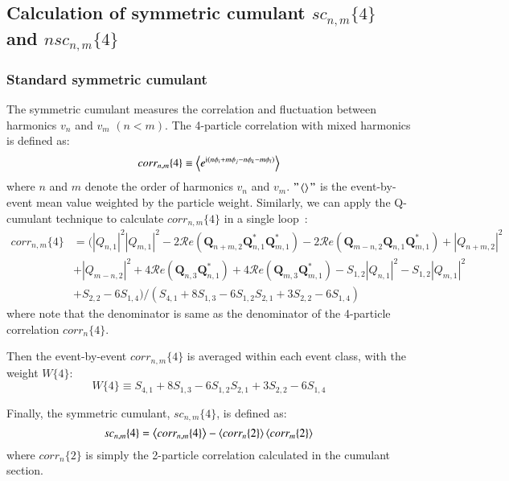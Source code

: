 \subsection{Calculation of symmetric cumulant $sc_{n,m}\{4\}$ and $nsc_{n,m}\{4\}$}
\subsubsection{Standard symmetric cumulant}
The symmetric cumulant measures the correlation and fluctuation between harmonics $v_n$ and $v_m$ $(n<m)$. The 4-particle correlation with mixed harmonics is defined as:
\begin{equation}
corr_{n,m}\{4\}\equiv\left\langle e^{\text{i}(n\phi_i+m\phi_j-n\phi_k-m\phi_l)}\right\rangle
\end{equation}
where $n$ and $m$ denote the order of harmonics $v_n$ and $v_m$. $"\left\langle \right\rangle"$ is the event-by-event mean value weighted by the particle weight. Similarly, we can apply the Q-cumulant technique to calculate $corr_{n,m}\{4\}$ in a single loop~\cite{Jia:2017hbm}:
\begin{equation}
\begin{split}
corr_{n,m}\{4\}&=(|Q_{n,1}|^2|Q_{m,1}|^2-2\mathcal{R}\textit{e}(\pmb{Q}_{n+m,2}\pmb{Q}_{n,1}^*\pmb{Q}_{m,1}^*)-2\mathcal{R}\textit{e}(\pmb{Q}_{m-n,2}\pmb{Q}_{n,1}\pmb{Q}_{m,1}^*)+|Q_{n+m,2}|^2 \\
&+|Q_{m-n,2}|^2+4\mathcal{R}\textit{e}(\pmb{Q}_{n,3}\pmb{Q}_{n,1}^*)+4\mathcal{R}\textit{e}(\pmb{Q}_{m,3}\pmb{Q}_{m,1}^*)-S_{1,2}|Q_{n,1}|^2-S_{1,2}|Q_{m,1}|^2 \\
&+S_{2,2}-6S_{1,4})/(S_{4,1}+8S_{1,3}-6S_{1,2}S_{2,1}+3S_{2,2}-6S_{1,4})
\end{split}
\end{equation}
where note that the denominator is same as the denominator of the 4-particle correlation $corr_n\{4\}$.

Then the event-by-event $corr_{n,m}\{4\}$ is averaged within each event class, with the weight $W\{4\}$:
\begin{equation}
W\{4\}\equiv S_{4,1}+8S_{1,3}-6S_{1,2}S_{2,1}+3S_{2,2}-6S_{1,4}
\end{equation}

Finally, the symmetric cumulant, $sc_{n,m}\{4\}$, is defined as:
\begin{equation}
sc_{n,m}\{4\} = \left\langle corr_{n,m}\{4\}\right\rangle-\left\langle corr_n\{2\}\right\rangle\left\langle corr_m\{2\}\right\rangle
\end{equation}
where $corr_n\{2\}$ is simply the 2-particle correlation calculated in the cumulant section.


